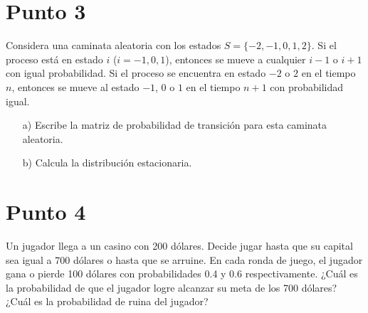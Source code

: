\documentclass[11pt]{article}\usepackage[]{graphicx}\usepackage[table]{xcolor}
\begin{document}
\section*{Punto 3}

Considera una caminata aleatoria con los estados $S=\{-2,-1,0,1,2\}$. Si el proceso está en estado $i$ ($i=-1,0,1$), entonces se mueve a cualquier $i-1$ o $i+1$ con igual probabilidad. Si el proceso se encuentra en estado $-2$ o $2$ en el tiempo $n$, entonces se mueve al estado $-1$, $0$ o $1$ en el tiempo $n+1$ con probabilidad igual.

\begin{enumerate}
    \item[a)] Escribe la matriz de probabilidad de transición para esta caminata aleatoria.
    \item[b)] Calcula la distribución estacionaria.
\end{enumerate}

\section*{Punto 4}

Un jugador llega a un casino con 200 dólares. Decide jugar hasta que su capital sea igual a 700 dólares o hasta que se arruine. En cada ronda de juego, el jugador gana o pierde 100 dólares con probabilidades 0.4 y 0.6 respectivamente. ¿Cuál es la probabilidad de que el jugador logre alcanzar su meta de los 700 dólares? ¿Cuál es la probabilidad de ruina del jugador?
\end{document}

